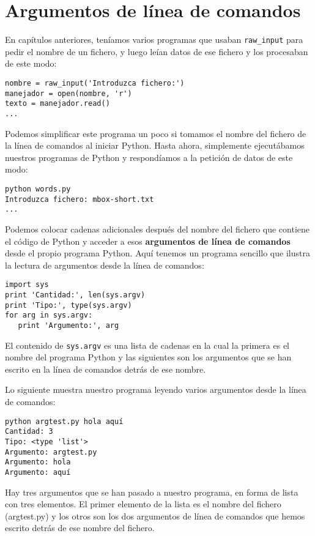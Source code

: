 \section{Argumentos de línea de comandos}


En capítulos anteriores, teníamos varios programas que usaban
\verb"raw_input" para pedir el nombre de un fichero, y luego leían datos
de ese fichero y los procesaban de este modo:

\beforeverb
\begin{verbatim}
nombre = raw_input('Introduzca fichero:')
manejador = open(nombre, 'r')
texto = manejador.read()
...
\end{verbatim}
\afterverb
%
Podemos simplificar este programa un poco si tomamos el nombre del fichero
de la línea de comandos al iniciar Python. Hasta ahora,
simplemente ejecutábamos nuestros programas de Python y respondíamos
a la petición de datos de este modo:

\beforeverb
\begin{verbatim}
python words.py
Introduzca fichero: mbox-short.txt
...
\end{verbatim}
\afterverb
%
Podemos colocar cadenas adicionales después del nombre del fichero que contiene el código de Python y
acceder a esos {\bf argumentos de línea de comandos} desde el propio programa Python.
Aquí tenemos un programa sencillo que ilustra la lectura de argumentos desde la línea de
comandos:

\beforeverb
\begin{verbatim}
import sys
print 'Cantidad:', len(sys.argv)
print 'Tipo:', type(sys.argv)
for arg in sys.argv:
   print 'Argumento:', arg
\end{verbatim}
\afterverb
%
El contenido de {\tt sys.argv} es una lista de cadenas en la cual la primera
es el nombre del programa Python y las siguientes son los argumentos que se han
escrito en la línea de comandos detrás de ese nombre.

Lo siguiente muestra nuestro programa leyendo varios argumentos desde la línea de
comandos:

\beforeverb
\begin{verbatim}
python argtest.py hola aquí
Cantidad: 3
Tipo: <type 'list'>
Argumento: argtest.py
Argumento: hola
Argumento: aquí
\end{verbatim}
\afterverb
%
Hay tres argumentos que se han pasado a nuestro programa, en forma de lista con tres elementos.
El primer elemento de la lista es el nombre del fichero (argtest.py) y los otros son
los dos argumentos de línea de comandos que hemos escrito detrás de ese nombre del fichero.

